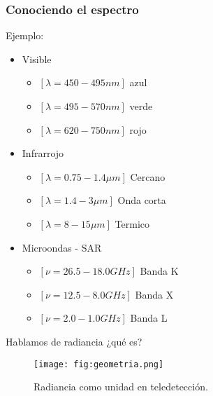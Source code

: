 \begin{frame}
  \frametitle{Conociendo el espectro}
  \begin{exampleblock}{Ejemplo:}
    \begin{itemize}
      \item<1,4> Visible
      \begin{itemize}
        \item<1,4> $[\lambda=450-495 nm]$ {\color{blue} azul}
        \item<1,4> $[\lambda=495-570 nm]$ {\color{green} verde}
        \item<1,4> $[\lambda=620-750 nm]$ {\color{red} rojo}
      \end{itemize}
      \item<2,4> Infrarrojo
      \begin{itemize}
        \item<2,4> $[\lambda=0.75-1.4\mu m]$ Cercano
        \item<2,4> $[\lambda=1.4-3\mu m]$ Onda corta
        \item<2,4> $[\lambda=8-15\mu m]$ Termico
      \end{itemize}
      \item<3,4> Microondas - SAR
      \begin{itemize}
        \item<3,4> $[\nu = 26.5 -18.0 GHz]$ Banda K
        \item<3,4> $[\nu = 12.5 - 8.0 GHz]$ Banda X
        \item<3,4> $[\nu = 2.0 - 1.0 GHz] $ Banda L
      \end{itemize}
    \end{itemize}
  \end{exampleblock}
\end{frame}

\begin {frame}
\begin{block}{Hablamos de radiancia}
      ¿qué es?
               \end{block}
\end{frame}

\begin{frame}{}
  \begin{figure}
    \centering
    \texttt{[image: fig:geometria.png]}
    \caption{Radiancia como unidad en teledetección.}
    \label{}
  \end{figure}
\end{frame}

